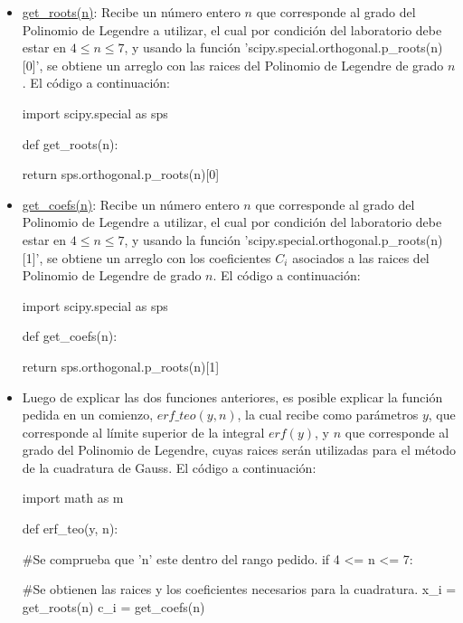 \documentclass[letter, 10pt]{article}
\begin{document}
\begin{itemize}
\item \underline{get\_roots(n)}: Recibe un n\'umero entero $n$ que corresponde al grado del Polinomio de Legendre a utilizar, el cual por condici\'on del laboratorio debe estar en $4 \leq n \leq 7$, y usando la funci\'on 'scipy.special.orthogonal.p\_roots(n)[0]', se obtiene un arreglo con las raices del Polinomio de Legendre de grado $n$. El c\'odigo a continuaci\'on:

\begin{python}
import scipy.special as sps

def get_roots(n):
    
    return sps.orthogonal.p_roots(n)[0]
\end{python}

\item \underline{get\_coefs(n)}: Recibe un n\'umero entero $n$ que corresponde al grado del Polinomio de Legendre a utilizar, el cual por condici\'on del laboratorio debe estar en $4 \leq n \leq 7$, y usando la funci\'on 'scipy.special.orthogonal.p\_roots(n)[1]', se obtiene un arreglo con los coeficientes $C_i$ asociados a las raices del Polinomio de Legendre de grado $n$. El c\'odigo a continuaci\'on:

\begin{python}
import scipy.special as sps

def get_coefs(n):        
    
    return sps.orthogonal.p_roots(n)[1]
\end{python}

\newpage

\item Luego de explicar las dos funciones anteriores, es posible explicar la funci\'on pedida en un comienzo, $erf\_teo(y, n)$, la cual recibe como par\'ametros $y$, que corresponde al l\'imite superior de la integral $erf(y)$, y $n$ que corresponde al grado del Polinomio de Legendre, cuyas raices ser\'an utilizadas para el m\'etodo de la cuadratura de Gauss. El c\'odigo a continuaci\'on:

\begin{python}
import math as m

def erf_teo(y, n):

#Se comprueba que 'n' este dentro del rango pedido.
    if 4 <= n <= 7:
    
#Se obtienen las raices y los coeficientes necesarios para la cuadratura.
        x_i = get_roots(n)
        c_i = get_coefs(n)    


\end{python}
\end{itemize}
\end{document}
